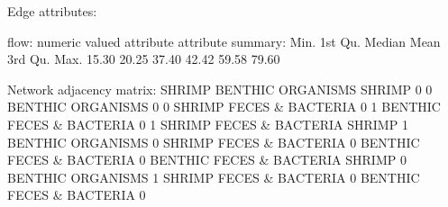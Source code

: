 \documentclass[article]{jss}
\begin{document}
\begin{Schunk}
\begin{Soutput}
Edge attributes:

 flow:
   numeric valued attribute
   attribute summary:
   Min. 1st Qu.  Median    Mean 3rd Qu.    Max. 
  15.30   20.25   37.40   42.42   59.58   79.60 

Network adjacency matrix:
                         SHRIMP BENTHIC ORGANISMS
SHRIMP                        0                 0
BENTHIC ORGANISMS             0                 0
SHRIMP FECES & BACTERIA       0                 1
BENTHIC FECES & BACTERIA      0                 1
                         SHRIMP FECES & BACTERIA
SHRIMP                                         1
BENTHIC ORGANISMS                              0
SHRIMP FECES & BACTERIA                        0
BENTHIC FECES & BACTERIA                       0
                         BENTHIC FECES & BACTERIA
SHRIMP                                          0
BENTHIC ORGANISMS                               1
SHRIMP FECES & BACTERIA                         0
BENTHIC FECES & BACTERIA                        0
\end{Soutput}
\end{Schunk}

\end{document}
